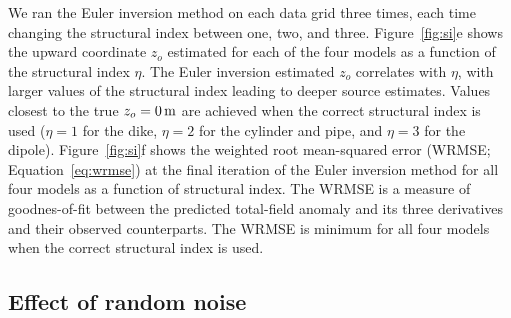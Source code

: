 We ran the Euler inversion method on each data grid three times, each time changing the structural index between one, two, and three.
Figure~\ref{fig:si}e shows the upward coordinate $z_o$ estimated for each of the four models as a function of the structural index $\eta$.
The Euler inversion estimated $z_o$ correlates with $\eta$, with larger values of the structural index leading to deeper source estimates. 
Values closest to the true $z_o=\SynSITrueUp$ are achieved when the correct structural index is used ($\eta=1$ for the dike, $\eta=2$ for the cylinder and pipe, and $\eta=3$ for the dipole).
Figure~\ref{fig:si}f shows the weighted root mean-squared error (WRMSE; Equation~\ref{eq:wrmse}) at the final iteration of the Euler inversion method for all four models as a function of structural index.
The WRMSE is a measure of goodnes-of-fit between the predicted total-field anomaly and its three derivatives and their observed counterparts.
The WRMSE is minimum for all four models when the correct structural index is used.


\subsection{Effect of random noise}
\label{sec:noise}

